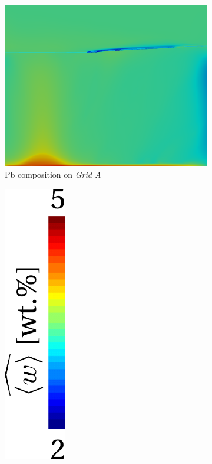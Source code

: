 \begin{figure}[H]
\centering
  \begin{subfigure}[t]{0.4\textwidth}
    \centering
  \includegraphics[width=\textwidth]{Chapter5/Graphics/2d/1700s_compo.png}
  \caption{Pb composition on \emph{Grid A}}
    \label{fig:1700s_compo}
  \end{subfigure}
  \begin{subfigure}[t]{0.15\textwidth}
    \centering
  \includegraphics[width=0.3\textwidth]{Chapter5/Graphics/2d/colorbar_w.pdf}

\end{subfigure}
\end{figure}
